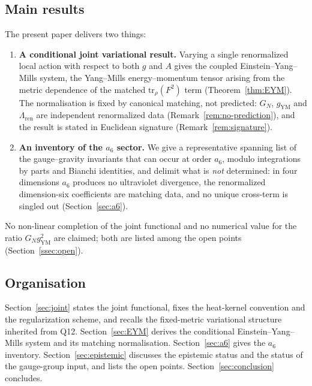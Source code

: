\documentclass[12pt,a4paper]{article}
\theoremstyle{remark}
\begin{document}
    \subsection{Main results}
      \label{ssec:main}

      The present paper delivers two things:

      \begin{enumerate}
        \item \textbf{A conditional joint variational result.}
        Varying a single renormalized local action with respect to both $g$ and $A$ gives the
        coupled Einstein--Yang--Mills system, the Yang--Mills energy--momentum tensor arising
        from the metric dependence of the matched $\mathrm{tr}_\rho(F^2)$ term
        (Theorem~\ref{thm:EYM}). The normalisation is fixed by canonical matching, not predicted:
        $G_N$, $g_{\mathrm{YM}}$ and $\Lambda_{\mathrm{ren}}$ are independent renormalized data
        (Remark~\ref{rem:no-prediction}), and the result is stated in Euclidean signature
        (Remark~\ref{rem:signature}).

        \item \textbf{An inventory of the $a_6$ sector.}
        We give a representative spanning list of the gauge--gravity invariants that can occur at
        order $a_6$, modulo integrations by parts and Bianchi identities, and delimit what is
        \emph{not} determined: in four dimensions $a_6$ produces no ultraviolet divergence, the
        renormalized dimension-six coefficients are matching data, and no unique cross-term is
        singled out (Section~\ref{sec:a6}).
      \end{enumerate}

      No non-linear completion of the joint functional and no numerical value for the ratio
      $G_N g_{\mathrm{YM}}^2$ are claimed; both are listed among the open points
      (Section~\ref{ssec:open}).

    \subsection{Organisation}
      \label{ssec:org}

      Section~\ref{sec:joint} states the joint functional, fixes the heat-kernel convention and
      the regularization scheme, and recalls the fixed-metric variational structure inherited
      from Q12.
      Section~\ref{sec:EYM} derives the conditional Einstein--Yang--Mills system and its
      matching normalisation.
      Section~\ref{sec:a6} gives the $a_6$ inventory.
      Section~\ref{sec:epistemic} discusses the epistemic status and the status of the
      gauge-group input, and lists the open points.
      Section~\ref{sec:conclusion} concludes.
\end{document}

